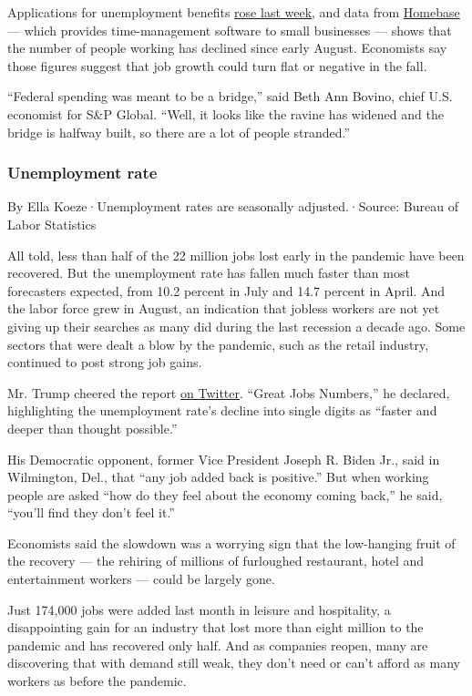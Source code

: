 Applications for unemployment benefits
\href{https://www.nytimes3xbfgragh.onion/2020/09/03/business/economy/unemployment-claims.html}{rose
last week}, and data from \href{https://joinhomebase.com/data}{Homebase}
--- which provides time-management software to small businesses ---
shows that the number of people working has declined since early August.
Economists say those figures suggest that job growth could turn flat or
negative in the fall.

``Federal spending was meant to be a bridge,'' said Beth Ann Bovino,
chief U.S. economist for S\&P Global. ``Well, it looks like the ravine
has widened and the bridge is halfway built, so there are a lot of
people stranded.''

\hypertarget{unemployment-rate}{%
\subsubsection{Unemployment rate}\label{unemployment-rate}}

By Ella Koeze·Unemployment rates are seasonally adjusted.·Source: Bureau
of Labor Statistics

All told, less than half of the 22 million jobs lost early in the
pandemic have been recovered. But the unemployment rate has fallen much
faster than most forecasters expected, from 10.2 percent in July and
14.7 percent in April. And the labor force grew in August, an indication
that jobless workers are not yet giving up their searches as many did
during the last recession a decade ago. Some sectors that were dealt a
blow by the pandemic, such as the retail industry, continued to post
strong job gains.

Mr. Trump cheered the report
\href{https://twitter.com/realDonaldTrump/status/1301868845678952448}{on
Twitter}. ``Great Jobs Numbers,'' he declared, highlighting the
unemployment rate's decline into single digits as ``faster and deeper
than thought possible.''

His Democratic opponent, former Vice President Joseph R. Biden Jr., said
in Wilmington, Del., that ``any job added back is positive.'' But when
working people are asked ``how do they feel about the economy coming
back,'' he said, ``you'll find they don't feel it.''

Economists said the slowdown was a worrying sign that the low-hanging
fruit of the recovery --- the rehiring of millions of furloughed
restaurant, hotel and entertainment workers --- could be largely gone.

Just 174,000 jobs were added last month in leisure and hospitality, a
disappointing gain for an industry that lost more than eight million to
the pandemic and has recovered only half. And as companies reopen, many
are discovering that with demand still weak, they don't need or can't
afford as many workers as before the pandemic.

